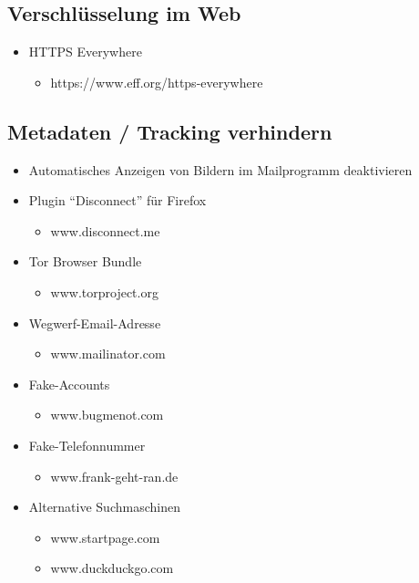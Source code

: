 \documentclass[a5paper]{scrartcl}
\begin{document}
\subsection*{Verschlüsselung im Web}
\begin{itemize}
  \item HTTPS Everywhere
    \begin{itemize}
      \item https://www.eff.org/https-everywhere
    \end{itemize}
\end{itemize}

\subsection*{Metadaten / Tracking verhindern}
\begin{itemize}
  \item Automatisches Anzeigen von Bildern im Mailprogramm deaktivieren
  \item Plugin ``Disconnect'' für Firefox 
    \begin{itemize}
      \item www.disconnect.me
    \end{itemize}
  \item Tor Browser Bundle 
    \begin{itemize}
      \item www.torproject.org
    \end{itemize}
  \item Wegwerf-Email-Adresse 
    \begin{itemize}
      \item www.mailinator.com
    \end{itemize}
  \item Fake-Accounts
    \begin{itemize}
      \item www.bugmenot.com
    \end{itemize}
  \item Fake-Telefonnummer 
    \begin{itemize}
      \item www.frank-geht-ran.de
    \end{itemize}
  \item Alternative Suchmaschinen 
    \begin{itemize}
      \item www.startpage.com 
      \item www.duckduckgo.com
    \end{itemize}
\end{itemize}
\end{document}
